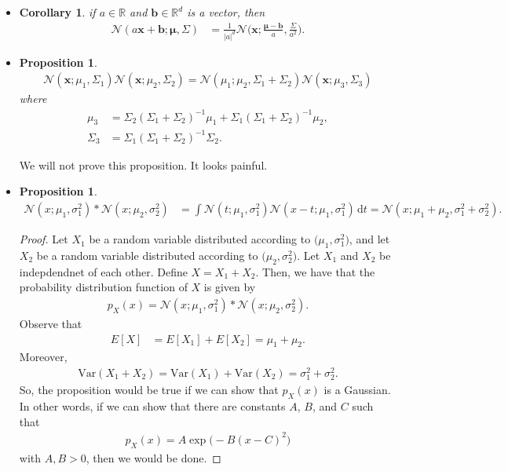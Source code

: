 \documentclass[10pt]{article}
\newtheorem{proposition}[lemma]{Proposition}
\newtheorem{corollary}[lemma]{Corollary}
\newcommand{\dee}{\mathrm{d}}
\newcommand{\Var}{\mathrm{Var}}
\newcommand{\ve}[1]{\mathbf{#1}}
\newcommand{\ves}[1]{\boldsymbol{#1}}
\newcommand{\mcal}[1]{\mathcal{#1}}
\newcommand{\Real}{\mathbb{R}}
\newcommand{\N}{\mathcal{N}}
\begin{document}
\begin{itemize}
  \item \begin{corollary}
    if $a \in \Real$ and $\ve{b} \in \Real^d$ is a vector, then
    \begin{align*}
      \N(a\ve{x} + \ve{b}; \ves{\mu}, \Sigma)
      &= \frac{1}{|a|^d} \N\bigg(\ve{x}; \frac{\ves{\mu} - \ve{b}}{a}, \frac{\Sigma}{a^2}\bigg).
    \end{align*}
  \end{corollary}

  \item \begin{proposition}
    \begin{align*}
      \N(\ve{x};\mu_1, \Sigma_1) \N(\ve{x};\mu_2, \Sigma_2) = \N(\mu_1; \mu_2, \Sigma_1 + \Sigma_2) \N(\ve{x}; \mu_3, \Sigma_3)
  \end{align*}
  where
  \begin{align*}
  \mu_3 &= \Sigma_2(\Sigma_1 + \Sigma_2)^{-1} \mu_1 + \Sigma_1(\Sigma_1 + \Sigma_2)^{-1} \mu_2, \\
  \Sigma_3 &= \Sigma_1 (\Sigma_1 + \Sigma_2)^{-1} \Sigma_2.
  \end{align*}
  \end{proposition}

  We will not prove this proposition. It looks painful.

  \item \begin{proposition} \label{gaussian-convolution}
    \begin{align*}
    \mcal{N}(x;\mu_1, \sigma_1^2) * \mcal{N}(x;\mu_2, \sigma_2^2)
    &= \int \mcal{N}(t;\mu_1, \sigma_1^2) \mcal{N}(x-t;\mu_1, \sigma_1^2)\, \dee t
    = \mcal{N}(x; \mu_1 + \mu_2, \sigma_1^2 + \sigma_2^2).
    \end{align*}
  \end{proposition}
  \begin{proof}
    Let $X_1$ be a random variable distributed according to $\mcal(\mu_1, \sigma_1^2)$, and let $X_2$ be a random variable distributed according to $\mcal(\mu_2, \sigma_2^2)$. Let $X_1$ and $X_2$ be indepdendnet of each other. Define $X = X_1 + X_2$. Then,
    we have that the probability distribution function of $X$ is given by
    \begin{align*}
      p_X(x) = \mcal{N}(x;\mu_1, \sigma_1^2) * \mcal{N}(x;\mu_2, \sigma_2^2).
    \end{align*}
    Observe that 
    \begin{align*}
      E[X] &= E[X_1] + E[X_2] = \mu_1 + \mu_2.
    \end{align*}
    Moreover,
    \begin{align*}
      \Var(X_1 + X_2) = \Var(X_1) + \Var(X_2) = \sigma_1^2 + \sigma_2^2.
    \end{align*}
    So, the proposition would be true if we can show that $p_X(x)$ is a Gaussian. In other words, if we can show that there are constants $A$, $B$, and $C$ such that
    \begin{align*}
      p_X(x) = A \exp\big(-B(x - C)^2\big)
    \end{align*}    
    with $A, B > 0$, then we would be done.


\end{proof}
\end{itemize}
\end{document}
